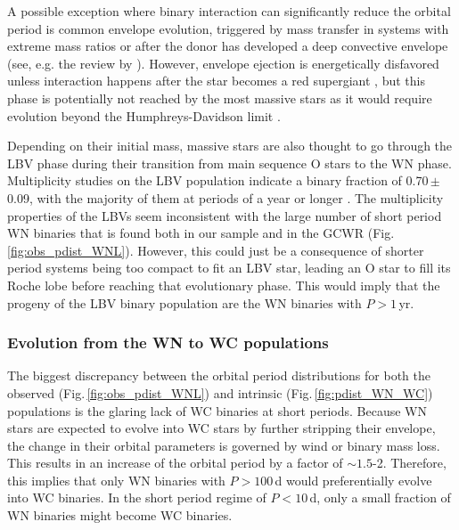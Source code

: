 A possible exception where binary interaction can significantly reduce the orbital period is common envelope evolution, triggered by mass transfer in systems with extreme mass ratios or after the donor has developed a deep convective envelope (see, e.g. the review by \citealt{ivanova_common_2013}). However, envelope ejection is energetically disfavored unless interaction happens after the star becomes a red supergiant \citep[e.g.][]{klencki_it_2021}, but this phase is potentially not reached by the most massive stars as it would require evolution beyond the Humphreys-Davidson limit \citep{humphreys_studies_1979,davies_luminosities_2018,gilkis_excess_2021}.

Depending on their initial mass, massive stars are also thought to go through the LBV phase during their transition from main sequence O stars to the WN phase. Multiplicity studies on the LBV population indicate a binary fraction of 0.70\,$\pm$\,0.09, with the majority of them at periods of a year or longer \citep{mahy_multiplicity_2022}. The multiplicity properties of the LBVs seem inconsistent with the large number of short period WN binaries that is found both in our sample and in the GCWR (Fig.\,\ref{fig:obs_pdist_WNL}). However, this could just be a consequence of shorter period systems being too compact to fit an LBV star, leading an O star to fill its Roche lobe before reaching that evolutionary phase. This would imply that the progeny of the LBV binary population are the WN binaries with $P>1$\,yr.

\subsubsection{Evolution from the WN to WC populations}\label{sect:evol_WNWC}

The biggest discrepancy between the orbital period distributions for both the observed (Fig.\,\ref{fig:obs_pdist_WNL}) and intrinsic (Fig.\,\ref{fig:pdist_WN_WC}) populations is the glaring lack of WC binaries at short periods. Because WN stars are expected to evolve into WC stars by further stripping their envelope, the change in their orbital parameters is governed by wind or binary mass loss. This results in an increase of the orbital period by a factor of ${\sim}1.5$-2. Therefore, this implies that only WN binaries with $P>100\,$d would preferentially evolve into WC binaries. In the short period regime of $P<10\,$d, only a small fraction of WN binaries might become WC binaries.

